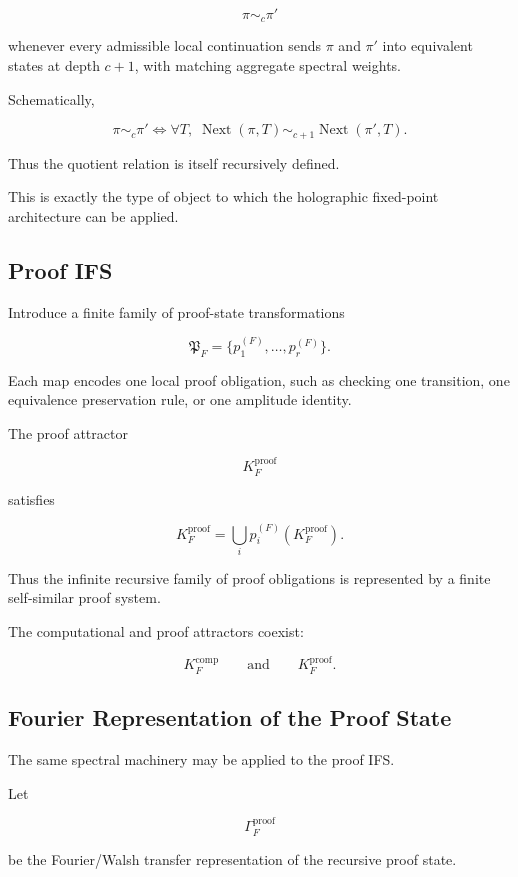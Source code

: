 \documentclass[11pt]{article}
\theoremstyle{plain}
\theoremstyle{definition}
\begin{document}
\[
    \pi\sim_c\pi'
\]

whenever every admissible local continuation sends \(\pi\) and \(\pi'\) into
equivalent states at depth \(c+1\), with matching aggregate spectral weights.

Schematically,

\[
\boxed{
\pi\sim_c\pi'
\iff
\forall T,\;
\operatorname{Next}(\pi,T)
\sim_{c+1}
\operatorname{Next}(\pi',T).
}
\]

Thus the quotient relation is itself recursively defined.

This is exactly the type of object to which the holographic fixed-point
architecture can be applied.

\subsection{Proof IFS}

Introduce a finite family of proof-state transformations

\[
    \mathfrak{P}_F
    =
    \{
        p_1^{(F)},
        \dots,
        p_r^{(F)}
    \}.
\]

Each map encodes one local proof obligation, such as checking one transition,
one equivalence preservation rule, or one amplitude identity.

The proof attractor

\[
    K_F^{\mathrm{proof}}
\]

satisfies

\[
\boxed{
K_F^{\mathrm{proof}}
=
\bigcup_i
p_i^{(F)}
\left(
K_F^{\mathrm{proof}}
\right).
}
\]

Thus the infinite recursive family of proof obligations is represented by a
finite self-similar proof system.

The computational and proof attractors coexist:

\[
\boxed{
K_F^{\mathrm{comp}}
\qquad\text{and}\qquad
K_F^{\mathrm{proof}}.
}
\]

\subsection{Fourier Representation of the Proof State}

The same spectral machinery may be applied to the proof IFS.

Let

\[
    \Gamma_F^{\mathrm{proof}}
\]

be the Fourier/Walsh transfer representation of the recursive proof state.
\end{document}
